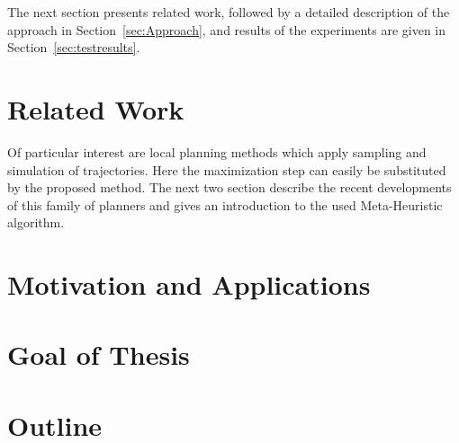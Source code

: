 The next section presents related work, followed by a detailed description of the approach in Section~\ref{sec:Approach}, and results of the experiments are given in Section~\ref{sec:testresults}. 
\section{Related Work} \label{sec:RelatedWork}
Of particular interest are local planning methods which apply sampling and simulation of trajectories. 
Here the maximization step can easily be substituted by the proposed method. The next two section describe the recent developments of this family of planners and gives an introduction to the used Meta-Heuristic algorithm.

\section{Motivation and Applications}\label{sec:motivation}

\section{Goal of Thesis}\label{sec:goal}

\section{Outline}\label{sec:outline}




